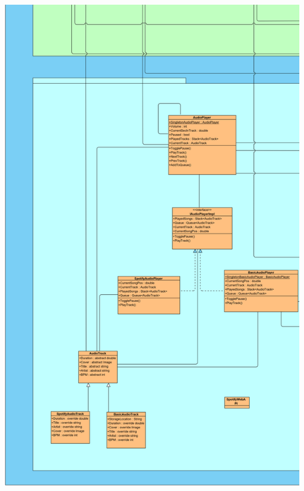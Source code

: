 \documentclass[../entwurf.tex]{subfiles}
\begin{document}
\includegraphics[scale=0.12]{../graphics/uml_diagramme/Gesamt/4.png}
\newpage
\end{document}
